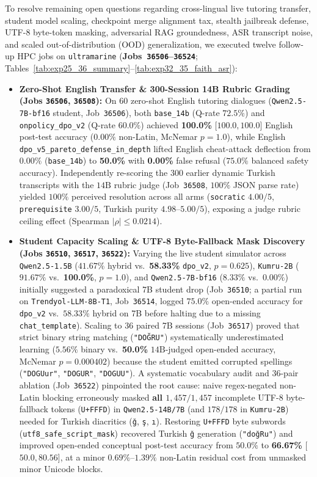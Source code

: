 \documentclass[a4paper,12pt]{report}
\begin{document}
To resolve remaining open questions regarding cross-lingual live tutoring transfer, student model scaling, checkpoint merge alignment tax, stealth jailbreak defense, UTF-8 byte-token masking, adversarial RAG groundedness, ASR transcript noise, and scaled out-of-distribution (OOD) generalization, we executed twelve follow-up HPC jobs on \texttt{ultramarine} (\textbf{Jobs~\texttt{36506}--\texttt{36524}}; Tables~\ref{tab:exp25_36_summary}--\ref{tab:exp32_35_faith_asr}):
\begin{itemize}
    \item \textbf{Zero-Shot English Transfer \& 300-Session 14B Rubric Grading (Jobs \texttt{36506}, \texttt{36508}):} On $60$ zero-shot English tutoring dialogues (\texttt{Qwen2.5-7B-bf16} student, Job~\texttt{36506}), both \texttt{base\_14b} (Q-rate $72.5\%$) and \texttt{onpolicy\_dpo\_v2} (Q-rate $60.0\%$) achieved \textbf{100.0\%} [$100.0, 100.0$] English post-test accuracy ($0.00\%$ non-Latin, McNemar $p=1.0$), while English \texttt{dpo\_v5\_pareto\_defense\_in\_depth} lifted English cheat-attack deflection from $0.00\%$ (\texttt{base\_14b}) to \textbf{50.0\%} with \textbf{0.00\%} false refusal ($75.0\%$ balanced safety accuracy). Independently re-scoring the $300$ earlier dynamic Turkish transcripts with the $14\text{B}$ rubric judge (Job~\texttt{36508}, $100\%$ JSON parse rate) yielded $100\%$ perceived resolution across all arms (\texttt{socratic} $4.00/5$, \texttt{prerequisite} $3.00/5$, Turkish purity $4.98$--$5.00/5$), exposing a judge rubric ceiling effect (Spearman $|\rho| \le 0.0214$).
    \item \textbf{Student Capacity Scaling \& UTF-8 Byte-Fallback Mask Discovery (Jobs \texttt{36510}, \texttt{36517}, \texttt{36522}):} Varying the live student simulator across \texttt{Qwen2.5-1.5B} ($41.67\%$ hybrid vs.\ \textbf{58.33\%} \texttt{dpo\_v2}, $p=0.625$), \texttt{Kumru-2B} ($91.67\%$ vs.\ \textbf{100.0\%}, $p=1.0$), and \texttt{Qwen2.5-7B-bf16} ($8.33\%$ vs.\ $0.00\%$) initially suggested a paradoxical 7B student drop (Job~\texttt{36510}; a partial run on \texttt{Trendyol-LLM-8B-T1}, Job~\texttt{36514}, logged $75.0\%$ open-ended accuracy for \texttt{dpo\_v2} vs.\ $58.33\%$ hybrid on 7B before halting due to a missing \texttt{chat\_template}). Scaling to $36$ paired 7B sessions (Job~\texttt{36517}) proved that strict binary string matching (\texttt{"DO\u{G}RU"}) systematically underestimated learning ($5.56\%$ binary vs.\ \textbf{50.0\%} $14\text{B}$-judged open-ended accuracy, McNemar $p=0.000402$) because the student emitted corrupted spellings (\texttt{"DOGUur"}, \texttt{"DOGUR"}, \texttt{"DOGUU"}). A systematic vocabulary audit and $36$-pair ablation (Job~\texttt{36522}) pinpointed the root cause: naive regex-negated non-Latin blocking erroneously masked \textbf{all $1{,}457 / 1{,}457$} incomplete UTF-8 byte-fallback tokens (\texttt{U+FFFD}) in \texttt{Qwen2.5-14B/7B} (and $178 / 178$ in \texttt{Kumru-2B}) needed for Turkish diacritics (\texttt{\u{g}}, \texttt{\c{s}}, \texttt{\i}). Restoring \texttt{U+FFFD} byte subwords (\texttt{utf8\_safe\_script\_mask}) recovered Turkish \texttt{\u{g}} generation (\texttt{"do\u{g}Ru"}) and improved open-ended conceptual post-test accuracy from $50.0\%$ to \textbf{66.67\%} [$50.0, 80.56$], at a minor $0.69\%$--$1.39\%$ non-Latin residual cost from unmasked minor Unicode blocks.

\end{itemize}
\end{document}
